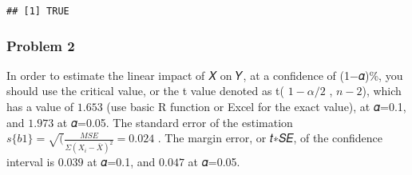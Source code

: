 \documentclass[
]{article}
\newenvironment{Shaded}{\begin{snugshade}}{\end{snugshade}}
\newcommand{\CommentTok}[1]{\textcolor[rgb]{0.56,0.35,0.01}{\textit{#1}}}
\newcommand{\DecValTok}[1]{\textcolor[rgb]{0.00,0.00,0.81}{#1}}
\newcommand{\FunctionTok}[1]{\textcolor[rgb]{0.13,0.29,0.53}{\textbf{#1}}}
\newcommand{\NormalTok}[1]{#1}
\newcommand{\OtherTok}[1]{\textcolor[rgb]{0.56,0.35,0.01}{#1}}
\newcommand{\SpecialCharTok}[1]{\textcolor[rgb]{0.81,0.36,0.00}{\textbf{#1}}}
\begin{document}
\begin{Shaded}
\end{Shaded}

\begin{verbatim}
## [1] TRUE
\end{verbatim}

\subsubsection{Problem 2}\label{problem-2}

In order to estimate the linear impact of 𝑋 on 𝑌, at a confidence of
(1−𝛼)\%, you should use the critical value, or the t value denoted as t(
\(1-\alpha/2\) , \(n-2\)), which has a value of \(1.653\) (use basic R
function or Excel for the exact value), at 𝛼=0.1, and \(1.973\) at
𝛼=0.05. The standard error of the estimation
\(s\{b1\} = \sqrt(\frac{MSE}{\Sigma(X_{i}-\bar{X})^2}=0.024\) . The
margin error, or 𝑡∗𝑆𝐸, of the confidence interval is \(0.039\) at 𝛼=0.1,
and \(0.047\) at 𝛼=0.05.
\end{document}
